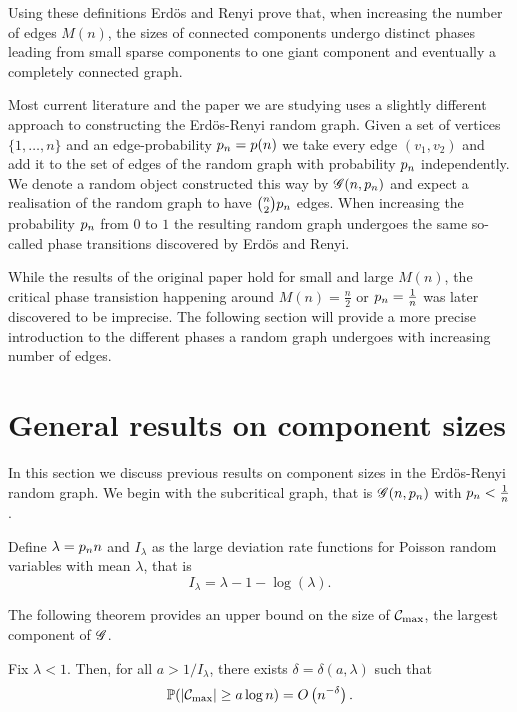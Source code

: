 Using these definitions Erdös and Renyi prove that,
when increasing the number of edges $M(n)$,
the sizes of connected components undergo distinct phases leading from small sparse components
to one giant component and eventually a completely connected graph.

Most current literature and the paper we are studying uses a slightly different approach to constructing the Erdös-Renyi random graph.
Given a set of vertices $\{1, \dots, n\}$ and an edge-probability $p_n = p(n)$
we take every edge $(v_1, v_2)$ and add it to the set of edges of the random graph with probability $p_n$ independently.
We denote a random object constructed this way by $\mathscr{G}(n, p_n)$ and expect a realisation of the random graph to have $\binom{n}{2}p_n$ edges.
When increasing the probability $p_n$ from $0$ to $1$ the resulting random graph undergoes the same so-called phase transitions
discovered by Erdös and Renyi.

While the results of the original paper hold for small and large $M(n)$,
the critical phase transistion happening around $M(n) = \frac{n}{2}$ or $p_n = \frac{1}{n}$
was later discovered to be imprecise.
The following section will provide a more precise introduction to the different phases a random graph undergoes
with increasing number of edges.


\section{General results on component sizes}

In this section we discuss previous results on component sizes in the Erdös-Renyi random graph.
We begin with the subcritical graph, that is
$\mathscr{G}(n, p_n)$ with $p_n < \frac{1}{n}$.

Define $\lambda = p_n n$ and $I_{\lambda}$ as the large deviation rate functions for Poisson random variables with mean $\lambda$,
that is
\begin{equation}
	I_{\lambda} = \lambda - 1 - \log(\lambda).
\end{equation}

The following theorem provides an upper bound on the size of $\mathcal{C}_{\max}$, the largest component of $\mathscr{G}$.
\begin{theorem}
	Fix $\lambda < 1$. 
	Then, for all $a > 1/I_{\lambda}$, 
	there exists $\delta = \delta(a, \lambda)$ such that
	\begin{equation}
		\mathbb{P}( |\mathcal{C}_{\max}| \geq a \log n ) = O\left(n^{-\delta}\right).
	\end{equation}
\end{theorem}

